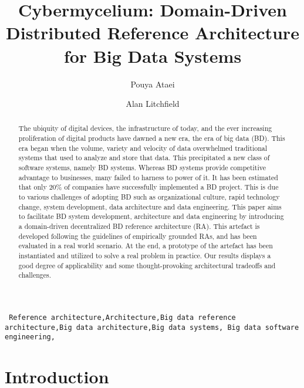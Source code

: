 \documentclass[review]{elsarticle}
\begin{document}
\begin{frontmatter}

\title{Cybermycelium: Domain-Driven Distributed Reference Architecture for Big Data Systems}

\author{Pouya Ataei}
\author{Alan Litchfield}

\address[mymainaddress]{School of Engineering, Computer and Mathematical Sciences, Auckland University of Technology, Auckland, New Zealand}


\begin{abstract}
The ubiquity of digital devices, the infrastructure of today, and the ever increasing proliferation of digital products have dawned a new era, the era of big data (BD). This era began when the volume, variety and velocity of data overwhelmed traditional systems that used to analyze and store that data. This precipitated a new class of software systems, namely BD systems. Whereas BD systems provide competitive advantage to businesses, many failed to harness to power of it. It has been estimated that only 20\% of companies have successfully implemented a BD project. This is due to various challenges of adopting BD such as organizational culture, rapid technology change, system development, data architecture and data engineering. This paper aims to facilitate BD system development, architecture and data engineering by introducing a domain-driven decentralized BD reference architecture (RA). This artefact is developed following the guidelines of empirically grounded RAs, and has been evaluated in a real world scenario. At the end, a prototype of the artefact has been instantiated and utilized to solve a real problem in practice. Our results displays a good degree of applicability and some thought-provoking architectural tradeoffs and challenges.
\end{abstract}

\begin{keyword}
\texttt{ Reference architecture\sep Architecture\sep Big data
reference architecture\sep Big data architecture\sep Big data systems\sep
Big data software engineering\sep}
\end{keyword}

\end{frontmatter}

\linenumbers


\section{Introduction}
\end{document}
